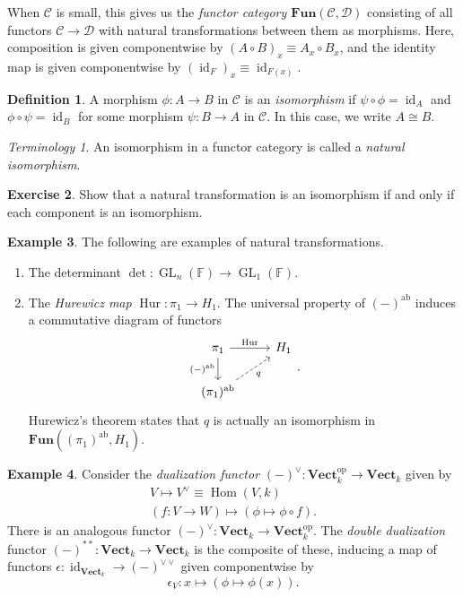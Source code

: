 \documentclass[10pt,letterpaper,cm]{nupset}
\theoremstyle{definition}
\newtheorem{definition}{Definition}[subsection]
\newtheorem{exmp}[definition]{Example}
\theoremstyle{theorem}
\newtheorem{exercise}[definition]{Exercise}
\theoremstyle{remark}
\newtheorem*{term}{Terminology}
\newcommand{\1}{\mathbf{1}}
\renewcommand{\c}{\mathscr{C}}
\renewcommand{\d}{\mathscr{D}}
\newcommand{\0}{\vec 0}
\DeclareMathOperator*{\GL}{GL}
\DeclareMathOperator{\id}{\mathrm{id}}
\DeclareMathOperator{\op}{op}
\DeclareMathOperator{\ab}{ab}
\DeclareMathOperator{\hur}{Hur}
\DeclareMathOperator{\Hom}{Hom}
\begin{document}
When $\c$ is small, this gives us the \textit{functor category $\mathbf{Fun}(\c, \d)$} consisting of all functors $\c \to \d$ with natural transformations between them as morphisms. Here, composition is given componentwise by $\left(A \circ B\right)_x \equiv A_x\circ B_x$, and the identity map is given componentwise by $\left(\id_F\right)_x \equiv \id_{F(x)}$.

\smallskip

\begin{definition}
A morphism $\phi : A \to B$ in $\c$ is an \textit{isomorphism} if $\psi \circ \phi = \id_A$ and $\phi \circ \psi = \id_B$ for some morphism $\psi : B \to A$ in $\c$. In this case, we write $A\cong B$.
\end{definition}

\begin{term}
An isomorphism in a functor category is called a \textit{natural isomorphism}.
\end{term}

\begin{exercise}
Show that a natural transformation is an isomorphism if and only if each component is an isomorphism.
\end{exercise}

\smallskip

\begin{exmp} The following are examples of natural transformations.
\begin{enumerate}
\item The determinant $\det : \GL_n(\mathbb{F}) \to \GL_1(\mathbb{F})$.
\item The \textit{Hurewicz map} $\hur: \pi_1 \to H_1$.  The universal property of $(-)^{\ab}$ induces a commutative diagram of functors
\[
\begin{tikzcd}
\pi_1 \arrow[r, "\hur"] \arrow[d, "(-)^{\ab}"'] & H_1 \\
(\pi_1)^{\ab} \arrow[ru, "q"', dashed] & 
\end{tikzcd}
.\] Hurewicz's theorem states that $q$ is actually an isomorphism in $\mathbf{Fun}(\left(\pi_1\right)^{\ab}, H_1)$.
\end{enumerate}
\end{exmp}

\smallskip

\begin{exmp}
Consider the \textit{dualization functor} $(-)^{\vee} : \mathbf{Vect}_k^{\op}  \to \mathbf{Vect}_k$ given by
\begin{gather*}
V \mapsto V^{\vee} \equiv \Hom(V, k)
\\ \left(f: V \to W\right) \mapsto \left( \phi \mapsto \phi \circ f\right).
\end{gather*}  
There is an analogous functor $(-)^{\vee} : \mathbf{Vect}_k \to \mathbf{Vect}_k^{\op}$. The \textit{double dualization} functor $(-)^{\ast \ast}: \mathbf{Vect}_k \to \mathbf{Vect}_k$ is the composite of these, inducing a map of functors $\epsilon: \id_{\mathbf{Vect}_k} \to (-)^{\vee \vee}$ given componentwise by $$\epsilon_V : x \mapsto \left(\phi \mapsto \phi(x)\right).$$
\end{exmp}
\end{document}
